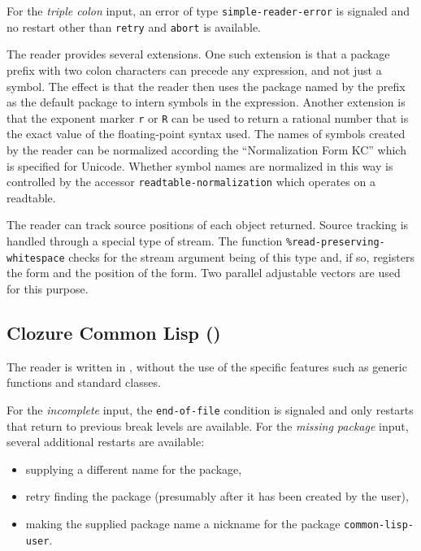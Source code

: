 \noindent
For the \emph{triple colon} input, an error of type
\texttt{simple-reader-error} is signaled and no restart other than
\texttt{retry} and \texttt{abort} is available.

The \sbcl{} reader provides several extensions.  One such extension is
that a package prefix with two colon characters can precede any
expression, and not just a symbol.  The effect is that the reader then
uses the package named by the prefix as the default package to intern
symbols in the expression.  Another extension is that the exponent
marker \texttt{r} or \texttt{R} can be used to return a rational
number that is the exact value of the floating-point syntax used.  The
names of symbols created by the \sbcl{} reader can be normalized
according the ``Normalization Form KC'' which is specified for
Unicode.  Whether symbol names are normalized in this way is
controlled by the accessor \texttt{readtable-normalization} which
operates on a readtable.

The \sbcl{} reader can track source positions of each object returned.
Source tracking is handled through a special type of stream.  The
function \texttt{\%read-preserving-whitespace} checks for the stream
argument being of this type and, if so, registers the form and the
position of the form.  Two parallel adjustable vectors are used for
this purpose.

\subsection{Clozure Common Lisp (\ccl{})}

The \ccl{} reader is written in \cl{}, without the use of the specific
\clos{} features such as generic functions and standard classes.

For the \emph{incomplete} input, the \texttt{end-of-file} condition is
signaled and only restarts that return to previous break levels are
available.  For the \emph{missing package} input, several additional
restarts are available:

\begin{itemize}
\item supplying a different name for the package,
\item retry finding the package (presumably after it has been created
  by the user),
\item making the supplied package name a nickname for the package
  \texttt{common-lisp-user}.
\end{itemize}

